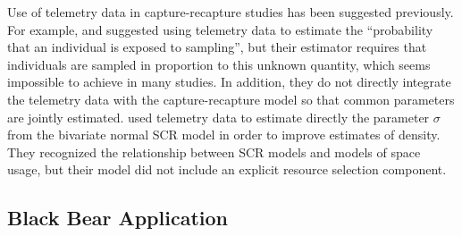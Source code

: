 \documentclass[12pt]{article}
\begin{document}
Use of telemetry data in capture-recapture studies has been suggested
previously. For example, \citet{white_shenk:2001} and
\citet{ivan:2012} suggested using telemetry data to estimate the
``probability that an individual is exposed to sampling'', but
their estimator requires that individuals are sampled in proportion to
this unknown quantity, which seems impossible to achieve in many
studies. In addition, they do not directly integrate the telemetry
data with the capture-recapture model so that common parameters are
jointly estimated.
 \citet{sollmann_etal:inprepjapplecol}
 used telemetry data to estimate directly the parameter $\sigma$ from
 the bivariate normal SCR model in order to improve estimates of
 density. They recognized the relationship between SCR models and
 models of space usage, but their model did not include an explicit
 resource selection component.



\subsection{Black Bear Application}
\end{document}
